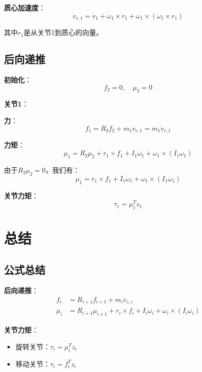 \documentclass[12pt,a4paper]{article}
\begin{document}
\textbf{质心加速度}：
\begin{equation}
\dot{v}_{c,1} = \dot{v}_1 + \dot{\omega}_1 \times r_1 + \omega_1 \times (\omega_1 \times r_1)
\end{equation}

其中$r_1$是从关节1到质心的向量。

\subsection{后向递推}

\textbf{初始化}：
\begin{equation}
f_2 = 0, \quad \mu_2 = 0
\end{equation}

\textbf{关节1}：

\textbf{力}：
\begin{equation}
f_1 = R_2 f_2 + m_1 \dot{v}_{c,1} = m_1 \dot{v}_{c,1}
\end{equation}

\textbf{力矩}：
\begin{equation}
\mu_1 = R_2 \mu_2 + r_1 \times f_1 + I_1 \dot{\omega}_1 + \omega_1 \times (I_1 \omega_1)
\end{equation}

由于$R_2 \mu_2 = 0$，我们有：
\begin{equation}
\mu_1 = r_1 \times f_1 + I_1 \dot{\omega}_1 + \omega_1 \times (I_1 \omega_1)
\end{equation}

\textbf{关节力矩}：
\begin{equation}
\tau_1 = \mu_1^T z_1
\end{equation}

\section{总结}

\subsection{公式总结}

\textbf{后向递推}：
\begin{align}
f_i &= R_{i+1} f_{i+1} + m_i \dot{v}_{c,i} \tag{24} \\
\mu_i &= R_{i+1} \mu_{i+1} + r_i \times f_i + I_i \dot{\omega}_i + \omega_i \times (I_i \omega_i) \tag{25}
\end{align}

\textbf{关节力矩}：
\begin{itemize}
\item 旋转关节：$\tau_i = \mu_i^T z_i$ 
\item 移动关节：$\tau_i = f_i^T z_i$ 
\end{itemize}
\end{document}
